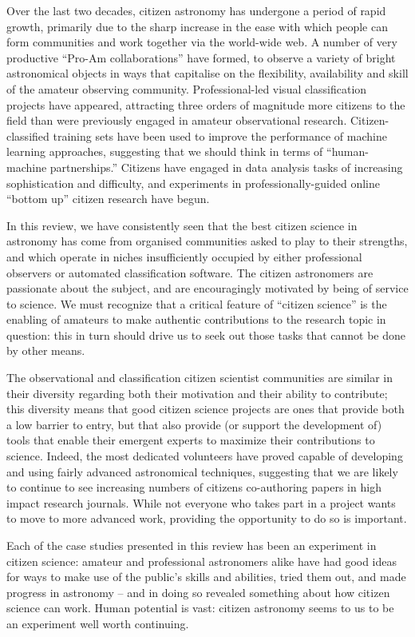 \documentclass{ar2e}
\begin{document}
Over the last two decades, citizen astronomy has undergone a period of rapid
growth, primarily due to the sharp increase in the ease with which people can
form communities and work together via the world-wide web.   A number of very
productive ``Pro-Am collaborations'' have formed, to observe a variety of bright
astronomical objects in ways that capitalise on the flexibility, availability
and skill of the amateur observing community. Professional-led visual
classification projects have appeared, attracting three orders of magnitude more
citizens to the field than were previously engaged in amateur observational
research. Citizen-classified training sets have been used to improve the
performance of  machine learning approaches, suggesting that we should think in
terms of ``human-machine partnerships.'' Citizens have engaged in data analysis
tasks of increasing sophistication and difficulty, and experiments in
professionally-guided online ``bottom up'' citizen research have begun.  

In this review, we have consistently seen that the best citizen science in
astronomy has come from organised communities asked to play to their strengths,
and which operate in niches insufficiently occupied by either professional
observers or automated classification software. The citizen astronomers are
passionate about the subject, and are encouragingly motivated by being of
service to science. We must recognize that a critical feature of ``citizen
science'' is the enabling of amateurs to make authentic contributions to the
research topic in question: this in turn should drive us to seek out those tasks
that cannot be done by other means.  

The observational and classification citizen scientist communities are similar
in their diversity regarding both their motivation and their ability to
contribute;  this diversity means that good citizen science projects are ones
that provide both a low barrier to entry, but that also provide (or support the
development of) tools that enable their emergent experts to maximize their
contributions to science.  Indeed, the most dedicated volunteers have proved
capable of developing and using fairly advanced astronomical techniques,
suggesting that we are likely to continue to see increasing numbers of citizens
co-authoring papers in high impact research journals. While not everyone who
takes part in a project wants to move to more advanced work, providing the
opportunity to do so is important.

Each of the case studies presented in this review has been an experiment in
citizen science: amateur and professional astronomers alike have had good ideas
for ways to make use of the public's skills and abilities, tried them out, and 
made progress in astronomy -- and in doing so revealed something about how
citizen science can work. Human potential is vast: citizen astronomy seems to us
to be an experiment well worth continuing. 
\end{document}
